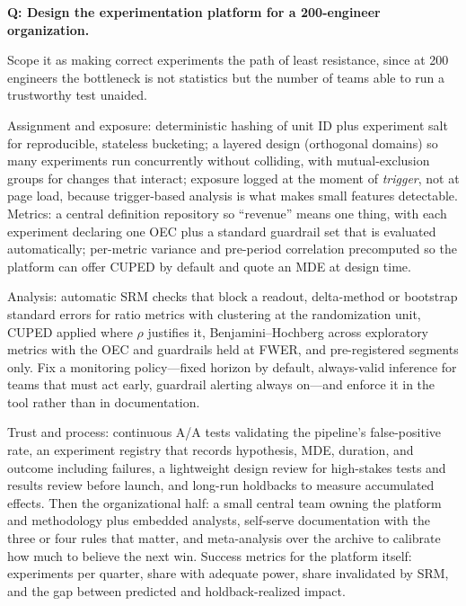 \begin{interviewq}
\textbf{Q: Design the experimentation platform for a 200-engineer organization.}

 \quad {} \quad \badgefreq{\freqmed}

\stronganswer

Scope it as making correct experiments the path of least resistance, since at 200 engineers the bottleneck is not statistics but the number of teams able to run a trustworthy test unaided.

Assignment and exposure: deterministic hashing of unit ID plus experiment salt for reproducible, stateless bucketing; a layered design (orthogonal domains) so many experiments run concurrently without colliding, with mutual-exclusion groups for changes that interact; exposure logged at the moment of \emph{trigger}, not at page load, because trigger-based analysis is what makes small features detectable. Metrics: a central definition repository so ``revenue'' means one thing, with each experiment declaring one OEC plus a standard guardrail set that is evaluated automatically; per-metric variance and pre-period correlation precomputed so the platform can offer CUPED by default and quote an MDE at design time.

Analysis: automatic SRM checks that block a readout, delta-method or bootstrap standard errors for ratio metrics with clustering at the randomization unit, CUPED applied where $\rho$ justifies it, Benjamini--Hochberg across exploratory metrics with the OEC and guardrails held at FWER, and pre-registered segments only. Fix a monitoring policy---fixed horizon by default, always-valid inference for teams that must act early, guardrail alerting always on---and enforce it in the tool rather than in documentation.

Trust and process: continuous A/A tests validating the pipeline's false-positive rate, an experiment registry that records hypothesis, MDE, duration, and outcome including failures, a lightweight design review for high-stakes tests and results review before launch, and long-run holdbacks to measure accumulated effects. Then the organizational half: a small central team owning the platform and methodology plus embedded analysts, self-serve documentation with the three or four rules that matter, and meta-analysis over the archive to calibrate how much to believe the next win. Success metrics for the platform itself: experiments per quarter, share with adequate power, share invalidated by SRM, and the gap between predicted and holdback-realized impact.


\end{interviewq}
